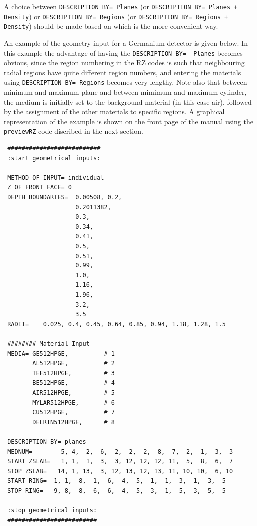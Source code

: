 \documentclass[12pt,twoside]{article}  %
\begin{document}
A choice between {\tt DESCRIPTION BY= Planes} (or
{\tt DESCRIPTION BY= Planes + Density}) or {\tt DESCRIPTION BY= Regions}
(or {\tt DESCRIPTION BY= Regions + Density}) should be made based on which 
is the more convenient way.

An example of the geometry input for a Germanium detector is given below.
In this example the advantage of having the \verb+DESCRIPTION BY=  Planes+
becomes obvious, since the region numbering in the RZ codes is such that
neighbouring radial regions have quite different region numbers, and 
entering the materials using \verb+DESCRIPTION BY= Regions+ becomes
very lengthy. Note also that between minimum and maximum plane and between
mimimum and maximum cylinder, the medium is initially 
set to the background material
(in this case air), followed by the assignment of the other materials to
specific regions.  A graphical representation of the example is shown on
the front page of the manual using the \verb+previewRZ+ code discribed
in the next section.
\begin{verbatim}
 ##########################
 :start geometrical inputs:

 METHOD OF INPUT= individual
 Z OF FRONT FACE= 0
 DEPTH BOUNDARIES=  0.00508, 0.2,
                    0.2011382,
                    0.3,
                    0.34,
                    0.41,
                    0.5,
                    0.51,
                    0.99,
                    1.0,
                    1.16,
                    1.96,
                    3.2,
                    3.5
 RADII=    0.025, 0.4, 0.45, 0.64, 0.85, 0.94, 1.18, 1.28, 1.5

 ######## Material Input
 MEDIA= GE512HPGE,          # 1
        AL512HPGE,          # 2
        TEF512HPGE,         # 3
        BE512HPGE,          # 4
        AIR512HPGE,         # 5
        MYLAR512HPGE,       # 6
        CU512HPGE,          # 7
        DELRIN512HPGE,      # 8

 DESCRIPTION BY= planes
 MEDNUM=        5, 4,  2,  6,  2,  2,  2,  8,  7,  2,  1,  3,  3
 START ZSLAB=   1, 1,  1,  3,  3, 12, 12, 12, 11,  5,  8,  6,  7
 STOP ZSLAB=   14, 1, 13,  3, 12, 13, 12, 13, 11, 10, 10,  6, 10
 START RING=  1, 1,  8,  1,  6,  4,  5,  1,  1,  3,  1,  3,  5
 STOP RING=   9, 8,  8,  6,  6,  4,  5,  3,  1,  5,  3,  5,  5

 :stop geometrical inputs:
 #########################
\end{verbatim}

\end{document}
